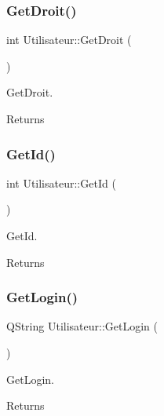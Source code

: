 \subsubsection{\texorpdfstring{Get\+Droit()}{GetDroit()}}
{\footnotesize\ttfamily int Utilisateur\+::\+Get\+Droit (\begin{DoxyParamCaption}{ }\end{DoxyParamCaption})}



Get\+Droit. 

\begin{DoxyReturn}{Returns}

\end{DoxyReturn}
\mbox{\label{class_utilisateur_a6cb20ba5bcbb83792e31f8a913178534}} 
\subsubsection{\texorpdfstring{Get\+Id()}{GetId()}}
{\footnotesize\ttfamily int Utilisateur\+::\+Get\+Id (\begin{DoxyParamCaption}{ }\end{DoxyParamCaption})}



Get\+Id. 

\begin{DoxyReturn}{Returns}

\end{DoxyReturn}
\mbox{\label{class_utilisateur_a3b830246e73edd798e0945e3b9904b93}} 
\subsubsection{\texorpdfstring{Get\+Login()}{GetLogin()}}
{\footnotesize\ttfamily Q\+String Utilisateur\+::\+Get\+Login (\begin{DoxyParamCaption}{ }\end{DoxyParamCaption})}



Get\+Login. 

\begin{DoxyReturn}{Returns}

\end{DoxyReturn}
\mbox{\label{class_utilisateur_ad558f2e85090c4660e97e6de6f8d1567}} 
